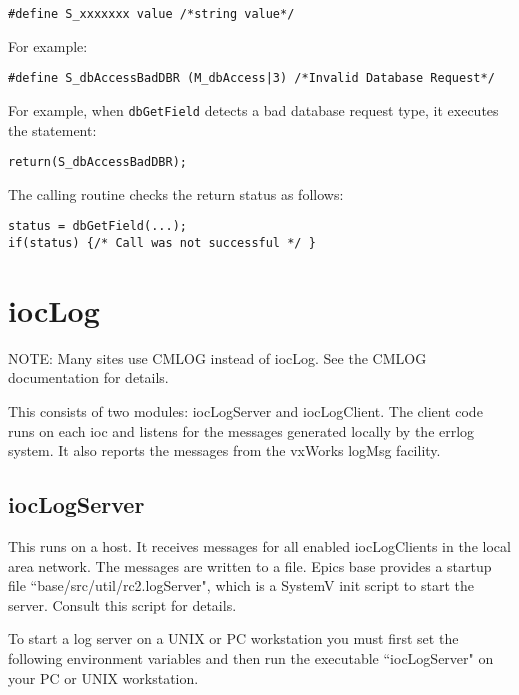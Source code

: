 \begin{verbatim}
#define S_xxxxxxx value /*string value*/
\end{verbatim}

For example:

\begin{verbatim}
#define S_dbAccessBadDBR (M_dbAccess|3) /*Invalid Database Request*/
\end{verbatim}

For example, when \verb|dbGetField| detects a bad database request type, it executes the statement:

\begin{verbatim}
return(S_dbAccessBadDBR);
\end{verbatim}

The calling routine checks the return status as follows:

\begin{verbatim}
status = dbGetField(...);
if(status) {/* Call was not successful */ }
\end{verbatim}

\section{iocLog}

NOTE: Many sites use CMLOG instead of iocLog.
See the CMLOG documentation for details.

This consists of two modules:
iocLogServer and iocLogClient.
The client code runs on each ioc and listens for the messages generated locally by the errlog system.
It also reports the messages from the vxWorks logMsg facility.

\subsection{iocLogServer}

This runs on a host.
It receives messages for all enabled iocLogClients in the local area network.
The messages are written to a file.
Epics base provides a startup file ``base/src/util/rc2.logServer", which is a SystemV init script to start the server.
Consult this script for details.

To start a log server on a UNIX or PC workstation you must first set the following environment variables and then run the executable ``iocLogServer" on your PC or UNIX workstation.


